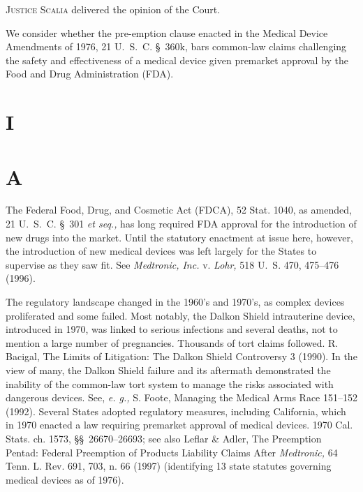 
\setcounter{page}{315}

  \textsc{Justice Scalia} delivered the opinion of the Court.

  We consider whether the pre-emption clause enacted in the Medical
Device Amendments of 1976, 21 U.~S.~C. \S~360k, bars common-law
claims challenging the safety and effectiveness of a medical device
given premarket approval by the Food and Drug Administration (FDA).

\section{I}

\section{A}

  The Federal Food, Drug, and Cosmetic Act (FDCA), 52 Stat. 1040, as
amended, 21 U.~S.~C. \S~301 \emph{et seq.,} has long required FDA
approval for the introduction of new drugs into the market. Until the
statutory enactment at issue here, however, the introduction of new
medical devices was left largely for the States to supervise as they saw
fit. See \emph{Medtronic, Inc.} v. \emph{Lohr,} 518 U.~S. 470, 475--476
(1996).

  The regulatory landscape changed in the 1960's and 1970's,
as complex devices proliferated and some failed. Most notably, the
Dalkon Shield intrauterine device, introduced in 1970, was linked to
serious infections and several deaths, not to mention a large number
of pregnancies. Thousands of tort claims followed. R. Bacigal,
The Limits of Litigation: The Dalkon Shield Controversy 3 (1990).
In the view of many, the Dalkon Shield failure and its aftermath
demonstrated the inability of the common-law tort system to manage the
risks associated with dangerous devices. See, \emph{e. g.,} S. Foote,
Managing the Medical Arms Race 151--152 (1992). Several States
adopted regulatory measures, including California, which in 1970
enacted a law requiring premarket approval of medical devices. 1970
Cal. Stats. ch. 1573, \newpage  \S\S~26670--26693; see also Leflar \&
Adler, The Preemption Pentad: Federal Preemption of Products Liability
Claims After \emph{Medtronic,} 64 Tenn. L. Rev. 691, 703, n. 66 (1997)
(identifying 13 state statutes governing medical devices as of 1976).

